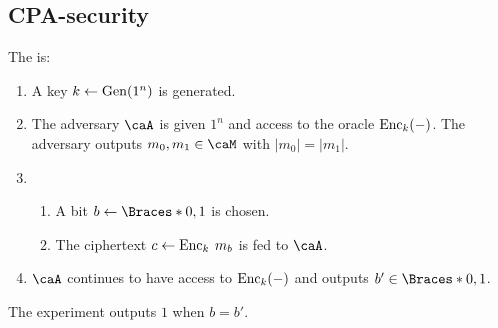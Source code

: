 \documentclass[a5paper]{article}
\begin{document}
\subsection{CPA-security}
\label{subsec:cpa-security}

\begin{definition*}
  The  is:
  \begin{enumerate}%
    \itemsep0em
    \item A key $k\leftarrow\operatorname{Gen}(1^n)$ is generated.
    \item The adversary $\caA$ is given $1^n$ and access to the oracle
      $\operatorname{Enc}_k(-)$. The adversary outputs $m_0,m_1\in\caM$ with $|m_0|=|m_1|$.
    \item
      \begin{enumerate}%
        \itemsep0em
        \item A bit $b\leftarrow \braces{0,1}$ is chosen.
        \item The ciphertext $c\leftarrow\operatorname{Enc}_k\hspace{0.23em} m_b$ is fed to $\caA$.
      \end{enumerate}
    \item $\caA$ continues to have access to $\operatorname{Enc}_k(-)$ and outputs
      $b'\in\braces{0,1}$.
  \end{enumerate}
  The experiment outputs $1$ when $b=b'$.
\end{definition*}
\end{document}
